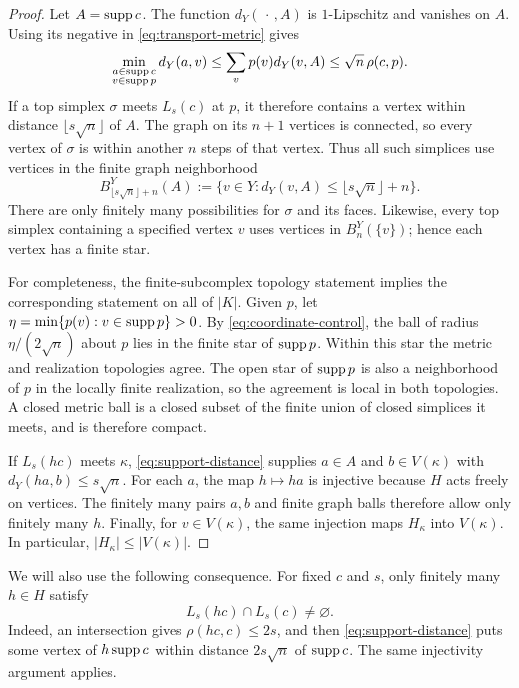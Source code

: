 \begin{proof}
Let \(A=\operatorname{supp} c\).  The function
\(d_Y(\,\cdot\,,A)\) is \(1\)-Lipschitz and vanishes on \(A\).
Using its negative in \eqref{eq:transport-metric} gives
\begin{equation}
 \min_{\substack{a\in\operatorname{supp} c\\v\in\operatorname{supp} p}}d_Y(a,v)
 \leq \sum_v p(v)d_Y(v,A)
 \leq\sqrt n\,\rho(c,p).
 \label{eq:support-distance}
\end{equation}
If a top simplex \(\sigma\) meets \(L_s(c)\) at \(p\), it therefore
contains a vertex within distance \(\lfloor s\sqrt n\rfloor\) of \(A\).
The graph on its \(n+1\) vertices is connected, so every vertex of
\(\sigma\) is within another \(n\) steps of that vertex.  Thus all
such simplices use vertices in the finite graph neighborhood
\[
 B^Y_{\lfloor s\sqrt n\rfloor+n}(A)
 :=\{v\in Y:d_Y(v,A)\leq\lfloor s\sqrt n\rfloor+n\}.
\]
There are only finitely many possibilities for \(\sigma\) and its
faces.  Likewise, every top simplex containing a specified vertex
\(v\) uses vertices in \(B^Y_n(\{v\})\); hence each vertex has a
finite star.

For completeness, the finite-subcomplex topology statement implies
the corresponding statement on all of \(|K|\).  Given \(p\), let
\(\eta=\min\{p(v):v\in\operatorname{supp} p\}>0\).  By
\eqref{eq:coordinate-control}, the ball of radius
\(\eta/(2\sqrt n)\) about \(p\) lies in the finite star of
\(\operatorname{supp} p\).  Within this star the metric and realization topologies
agree.  The open star of \(\operatorname{supp} p\) is also a neighborhood of \(p\)
in the locally finite realization, so the agreement is local in
both topologies.  A closed metric ball is a closed subset of the
finite union of closed simplices it meets, and is therefore compact.

If \(L_s(hc)\) meets \(\kappa\), \eqref{eq:support-distance} supplies
\(a\in A\) and \(b\in V(\kappa)\) with
\(d_Y(ha,b)\leq s\sqrt n\).  For each \(a\), the map \(h\mapsto ha\)
is injective because \(H\) acts freely on vertices.  The finitely
many pairs \(a,b\) and finite graph balls therefore allow only
finitely many \(h\).  Finally, for \(v\in V(\kappa)\), the same
injection maps \(H_\kappa\) into \(V(\kappa)\).  In particular,
\(|H_\kappa|\leq|V(\kappa)|\).
\end{proof}

We will also use the following consequence.  For fixed \(c\) and \(s\),
only finitely many \(h\in H\) satisfy
\begin{equation}
 L_s(hc)\cap L_s(c)\ne\varnothing.
 \label{eq:finite-ball-overlaps}
\end{equation}
Indeed, an intersection gives \(\rho(hc,c)\leq2s\), and then
\eqref{eq:support-distance} puts some vertex of \(h\operatorname{supp} c\)
within distance \(2s\sqrt n\) of \(\operatorname{supp} c\).  The same
injectivity argument applies.

